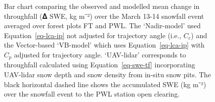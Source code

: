 \documentclass[
  letterpaper,
  DIV=11,
  numbers=noendperiod]{scrartcl}
\begin{document}
\begin{figure}


\caption{\label{fig-event-tf}Bar chart comparing the observed and
modelled mean change in throughfall (𝚫 SWE, kg m⁻²) over the March 13-14
snowfall event averaged over forest plots FT and PWL. The `Nadir-model'
used Equation~\ref{eq-lca-ip} not adjusted for trajectory angle (i.e.,
\(C_c\)) and the Vector-based `VB-model' which uses
Equation~\ref{eq-lca-ip} with \(C_p\) adjusted for trajectory angle.
`UAV-lidar' corresponds to throughfall calculated using
Equation~\ref{eq-swe-tf} incorporating UAV-lidar snow depth and snow
density from in-situ snow pits. The black horizontal dashed line shows
the accumulated SWE (kg m⁻²) over the snowfall event to the PWL station
open clearing.}

\end{figure}%
\end{document}

